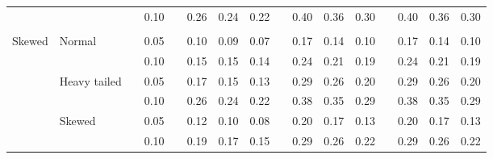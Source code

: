 \documentclass{article} %
\begin{document}
\begin{table}[ht]
\begin{scriptsize}
\begin{center}
\begin{tabular}{ll p{.1cm} c p{.1cm} rrr p{.1cm} rrr p{.1cm} rrr}
             &              && 0.10 &&  0.26 & 0.24 & 0.22 && 0.40 & 0.36 & 0.30 && 0.40 & 0.36 & 0.30 \\
             &&&&&&&&&&&&&&&\\ 
Skewed       & Normal       && 0.05 &&  0.10 & 0.09 & 0.07 && 0.17 & 0.14 & 0.10 && 0.17 & 0.14 & 0.10 \\ 
             &              && 0.10 &&  0.15 & 0.15 & 0.14 && 0.24 & 0.21 & 0.19 && 0.24 & 0.21 & 0.19 \\ 
             & Heavy tailed && 0.05 &&  0.17 & 0.15 & 0.13 && 0.29 & 0.26 & 0.20 && 0.29 & 0.26 & 0.20 \\ 
             &              && 0.10 &&  0.26 & 0.24 & 0.22 && 0.38 & 0.35 & 0.29 && 0.38 & 0.35 & 0.29 \\ 
             & Skewed       && 0.05 &&  0.12 & 0.10 & 0.08 && 0.20 & 0.17 & 0.13 && 0.20 & 0.17 & 0.13 \\ 
             &              && 0.10 &&  0.19 & 0.17 & 0.15 && 0.29 & 0.26 & 0.22 && 0.29 & 0.26 & 0.22 \\ 



\end{tabular}
\end{center}
\end{scriptsize}
\end{table}
\end{document}
